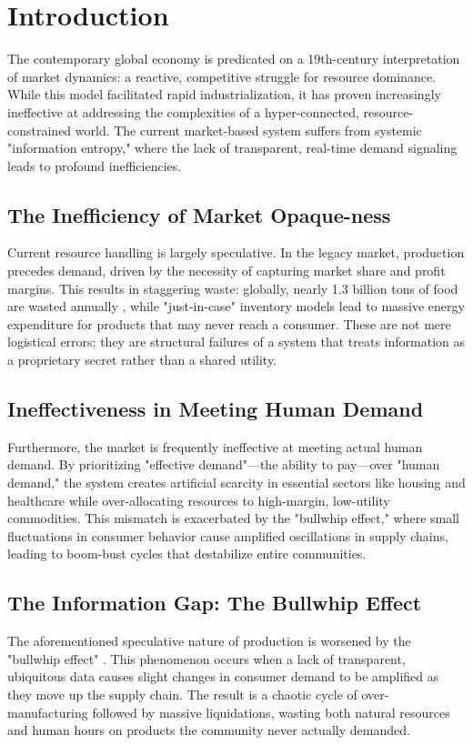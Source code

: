 
\section{Introduction}

The contemporary global economy is predicated on a 19th-century interpretation of market dynamics: a reactive, competitive struggle for resource dominance. While this model facilitated rapid industrialization, it has proven increasingly ineffective at addressing the complexities of a hyper-connected, resource-constrained world. The current market-based system suffers from systemic "information entropy," where the lack of transparent, real-time demand signaling leads to profound inefficiencies.

\subsection{The Inefficiency of Market Opaque-ness}
Current resource handling is largely speculative. In the legacy market, production precedes demand, driven by the necessity of capturing market share and profit margins. This results in staggering waste: globally, nearly 1.3 billion tons of food are wasted annually \cite{fao2021}, while "just-in-case" inventory models lead to massive energy expenditure for products that may never reach a consumer. These are not mere logistical errors; they are structural failures of a system that treats information as a proprietary secret rather than a shared utility.

\subsection{Ineffectiveness in Meeting Human Demand}
Furthermore, the market is frequently ineffective at meeting actual human demand. By prioritizing "effective demand"—the ability to pay—over "human demand," the system creates artificial scarcity in essential sectors like housing and healthcare while over-allocating resources to high-margin, low-utility commodities. This mismatch is exacerbated by the "bullwhip effect," where small fluctuations in consumer behavior cause amplified oscillations in supply chains, leading to boom-bust cycles that destabilize entire communities.

\subsection{The Information Gap: The Bullwhip Effect}
The aforementioned speculative nature of production is worsened by the "bullwhip effect" \cite{lee1997bullwhip}. This phenomenon occurs when a lack of transparent, ubiquitous data causes slight changes in consumer demand to be amplified as they move up the supply chain. The result is a chaotic cycle of over-manufacturing followed by massive liquidations, wasting both natural resources and human hours on products the community never actually demanded.

